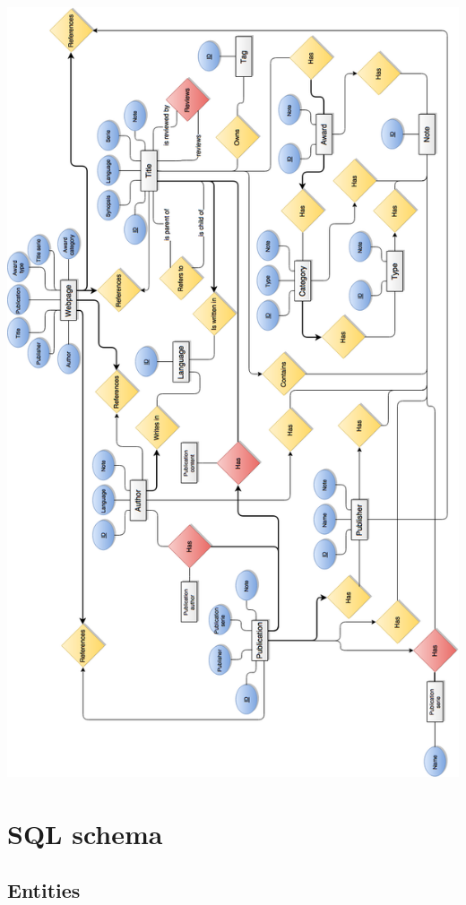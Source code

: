 \documentclass[doubleside, titlepage]{article}
\begin{document}
\begin{center}
    \includegraphics[scale = 0.5]{DBMS_ER}
\end{center}

\section{SQL schema}

\subsection{Entities}
\end{document}
